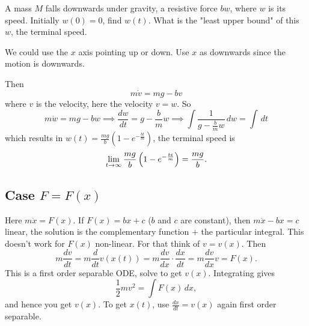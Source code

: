 \documentclass[10pt, a4paper]{article}
\begin{document}
\begin{example}
    A mass $M$ falls downwards under gravity,
    a resistive force $bw$,
    where $w$ is its speed.
    Initially $w(0) = 0$,
    find $w(t)$.
    What is the "least upper bound" of this $w$,
    the terminal speed.

    \begin{solution}
        We could use the $x$ axis pointing up or down.
        Use $x$ as downwards since the motion is downwards.

        Then
        \[
        m\dot{v} = mg - bv
        \]
        where $v$ is the velocity,
        here the velocity $v = w$.
        So
        \[
        m\dot{w} = mg - bw \implies \frac{dw}{dt} = g - \frac{b}{m}w \implies \int\frac{1}{g - \frac{b}{m}w}\,dw = \int\,dt
        \]
        which results in $w(t) = \frac{mg}{b}\left(1 - e ^ {-\frac{bt}{m}}\right)$,
        the terminal speed is
        \[
        \liminfty[t]\frac{mg}{b}\left(1 - e ^ {-\frac{bt}{m}}\right) = \frac{mg}{b}.
        \]
    \end{solution}
\end{example}

\subsection{Case \texorpdfstring{$F = F(x)$}{}}
Here $m\ddot{x} = F(x)$.
If $F(x) = bx + c$
($b$ and $c$ are constant),
then $m\ddot{x} - bx = c$ linear,
the solution is the complementary function $+$ the particular integral.
This doesn't work for $F(x)$ non-linear.
For that think of $v = v(x)$.
Then
\[
m\frac{dv}{dt} = m\frac{d}{dt}v(x(t)) = m\frac{dv}{dx}\cdot\frac{dx}{dt} = m\frac{dv}{dx}v = F(x).
\]
This is a first order separable ODE,
solve to get $v(x)$.
Integrating gives
\[
\frac{1}{2}mv ^ 2 = \int F(x)\,dx,
\]
and hence you get $v(x)$.
To get $x(t)$,
use $\frac{dx}{dt} = v(x)$ again first order separable.
\end{document}

